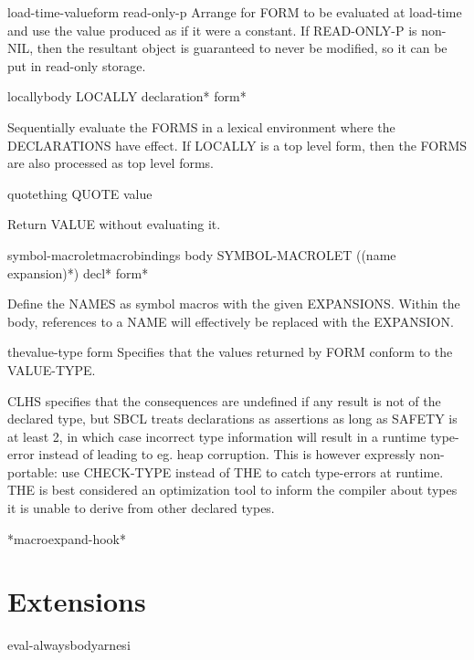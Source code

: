 \begin{specialop}{load-time-value}{form \op read-only-p}{}{}
  Arrange for FORM to be evaluated at load-time and use the value produced
   as if it were a constant. If READ-ONLY-P is non-NIL, then the resultant
   object is guaranteed to never be modified, so it can be put in read-only
   storage.
\end{specialop}

\begin{specialop}{locally}{\body body}{}{}
  LOCALLY declaration* form*

Sequentially evaluate the FORMS in a lexical environment where the
DECLARATIONS have effect. If LOCALLY is a top level form, then the FORMS are
also processed as top level forms.
\end{specialop}

\begin{specialop}{quote}{thing}{}{}
  QUOTE value

Return VALUE without evaluating it.
\end{specialop}

\begin{specialop}{symbol-macrolet}{macrobindings \body body}{}{}
  SYMBOL-MACROLET ({(name expansion)}*) decl* form*

Define the NAMES as symbol macros with the given EXPANSIONS. Within the
body, references to a NAME will effectively be replaced with the EXPANSION.
\end{specialop}

\begin{specialop}{the}{value-type form}{}{}
  Specifies that the values returned by FORM conform to the VALUE-TYPE.

CLHS specifies that the consequences are undefined if any result is
not of the declared type, but SBCL treats declarations as assertions
as long as SAFETY is at least 2, in which case incorrect type
information will result in a runtime type-error instead of leading to
eg. heap corruption. This is however expressly non-portable: use
CHECK-TYPE instead of THE to catch type-errors at runtime. THE is best
considered an optimization tool to inform the compiler about types it
is unable to derive from other declared types.
\end{specialop}

\begin{variable}{*macroexpand-hook*}{}{}{}
  
\end{variable}

\section{Extensions}
\label{sec:extensions}

\begin{macro}{eval-always}{\body body}{arnesi}{}
  
\end{macro}

